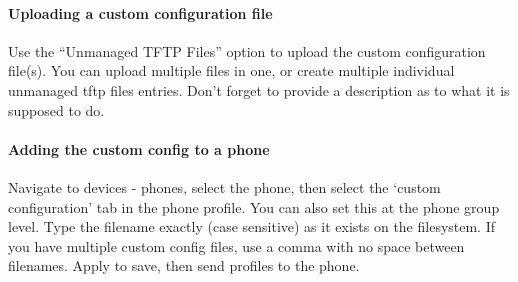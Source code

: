 \documentclass[letterpaper,10pt,english]{sphinxmanual}
\begin{document}
\begin{sphinxVerbatim}[commandchars=\\\{\}]
             
           
          
            
             
\end{sphinxVerbatim}


\paragraph{Uploading a custom configuration file}
\label{\detokenize{webui:uploading-a-custom-configuration-file}}
Use the “Unmanaged TFTP Files” option to upload the custom configuration file(s). You can upload multiple files in one, or create multiple individual unmanaged tftp files entries. Don’t forget to provide a description as to what it is supposed to do.



\paragraph{Adding the custom config to a phone}
\label{\detokenize{webui:adding-the-custom-config-to-a-phone}}
Navigate to devices - phones, select the phone, then select the ‘custom configuration’ tab in the phone profile. You can also set this at the phone group level.
Type the filename exactly (case sensitive) as it exists on the filesystem. If you have multiple custom config files, use a comma with no space between filenames. Apply to save, then send profiles to the phone.
\end{document}
